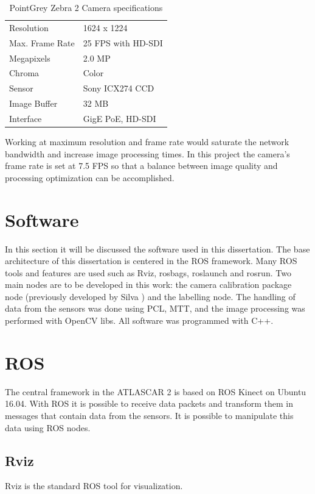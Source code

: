 \begin{table}[!h]
	\centering
	\caption{PointGrey Zebra 2 Camera specifications}
	\label{tab: pointgreyspecs}
	\begin{tabular}{ll}
		
		\hline
		Resolution & 1624 x 1224\\
		Max. Frame Rate & 25 FPS with HD-SDI \\
		Megapixels & 2.0 MP \\
		Chroma & Color\\
		Sensor & Sony ICX274 CCD \\
		Image Buffer &	32 MB\\
		Interface &	GigE PoE, HD-SDI\\
		
		\hline
	\end{tabular}
\end{table}

Working at maximum resolution and frame rate would saturate the network bandwidth and increase image processing times. In this project the camera's frame rate is set at 7.5 FPS so that a balance between image quality and processing optimization can be accomplished.


\section{Software}

In this section it will be discussed the software used in this dissertation. The base architecture of this dissertation is centered in the ROS framework. Many ROS tools and features are used such as Rviz, rosbags, roslaunch and rosrun. Two main nodes are to be developed in this work: the camera calibration package node (previously developed by Silva \cite{VieiradaSilva2016}) and the labelling node. The handling of data from the sensors was done using PCL, MTT, 
and the image processing was performed with OpenCV libs. All software was programmed with C++.

\section{ROS}
The central framework in the ATLASCAR 2 is based on ROS Kinect on Ubuntu 16.04. %
With ROS it is possible to receive data packets and transform them in messages that contain data from the sensors. It is possible to manipulate this data using ROS nodes.

\subsection{Rviz}
Rviz is the standard ROS tool for visualization. %


